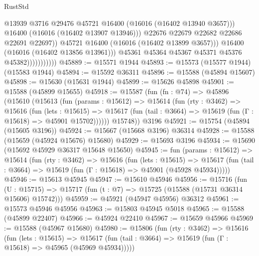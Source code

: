 \begin{lexlean}{RustStd}
\begin{coremodule}
                                      @13939
                                      @3716
                                      @29476
                                      @45721
                                      @16400
                                      (@16016 (@16402 @13940 @3657)))
                                    @16400
                                    (@16016 (@16402 @13907 @13946)))
                                  @22676
                                  @22679
                                  @22682
                                  @22686
                                  @22691
                                  @22697))
                              @45721
                              @16400
                              (@16016 (@16402 @13899 @3657)))
                            @16400
                            (@16016 (@16402 @13856 @13961)))
                          @45361
                          @45364
                          @45367
                          @45371
                          @45376
                          @45382)))))))))))
@45889 := @15571 @1944
@45893 := @15573 (@15577 @1944) (@15583 @1944)
@45894 := @15592 @36311
@45896 := @15588 (@45894 @15607)
@45898 := @15630 (@15631 @1944)
@45899 := @15626 @45898
@45901 := @15588 (@45899 @15655)
@45918 := @15587
    (fun (fn : @74) =>
    @45896
      (@15610
        (@15613
          (fun (params : @15612) =>
          @15614
            (fun (rty : @3462) =>
            @15616
              (fun (lets : @15615) =>
              @15617 (fun (tail : @3664) => @15619 (fun (Γ : @15618) => @45901 @15702))))))
        @15748))
    @3196
@45921 := @15754 (@45894 (@15605 @3196))
@45924 := @15667 (@15668 @3196) @36314
@45928 := @15588 (@15659 (@45924 @15676) @15680)
@45929 := @15693 @3196
@45934 := @15690 (@15692 @45929 @36317 @15648 @15650)
@45945 := fun (params : @15612) =>
  @15614
    (fun (rty : @3462) =>
    @15616
      (fun (lets : @15615) =>
      @15617 (fun (tail : @3664) => @15619 (fun (Γ : @15618) => @45901 (@45928 @45934)))))
@45946 := @15613 @45945
@45947 := @15610 @45946
@45956 := @15716
    (fun (U : @15715) => @15717 (fun (t : @7) => @15725 (@15588 (@15731 @36314 @15606) @15742)))
@45959 := @45921 (@45947 @45956) @36312
@45961 := @15573 @45946 @45956
@45963 := @15803 @45945 @5018
@45965 := @15588 (@45899 @22407)
@45966 := @45924 @22410
@45967 := @15659 @45966
@45969 := @15588 (@45967 @15680)
@45980 := @15806
    (fun (rty : @3462) =>
    @15616
      (fun (lets : @15615) =>
      @15617 (fun (tail : @3664) => @15619 (fun (Γ : @15618) => @45965 (@45969 @45934)))))

\end{coremodule}
\end{lexlean}
